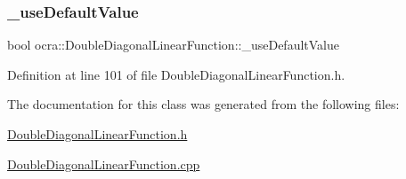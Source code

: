 \subsubsection{\texorpdfstring{\+\_\+use\+Default\+Value}{\_useDefaultValue}}
{\footnotesize\ttfamily bool ocra\+::\+Double\+Diagonal\+Linear\+Function\+::\+\_\+use\+Default\+Value\hspace{0.3cm}{\ttfamily [protected]}}



Definition at line 101 of file Double\+Diagonal\+Linear\+Function.\+h.



The documentation for this class was generated from the following files\+:\begin{DoxyCompactItemize}
\item 
\hyperlink{DoubleDiagonalLinearFunction_8h}{Double\+Diagonal\+Linear\+Function.\+h}\item 
\hyperlink{DoubleDiagonalLinearFunction_8cpp}{Double\+Diagonal\+Linear\+Function.\+cpp}\end{DoxyCompactItemize}
